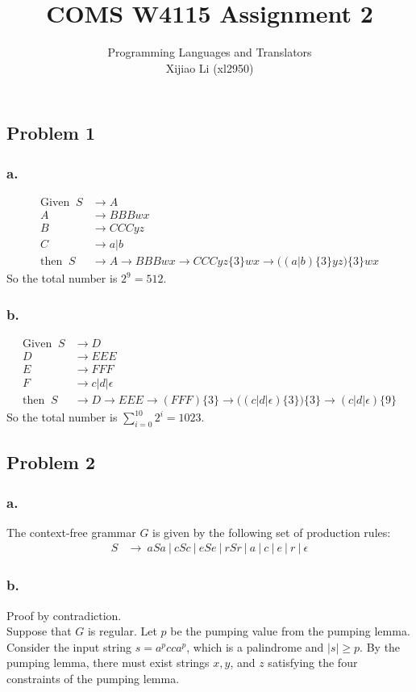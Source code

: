 \documentclass{article}
\title{COMS W4115
	Assignment 2}
\author{Programming Languages and Translators\medskip\\
	Xijiao Li (xl2950)}
\begin{document}
	
	\maketitle
	
	\newpage
	\subsection*{Problem 1}
	\subsubsection*{a.}
	\begin{align*}
		\text{Given }\  S &\to A \\
		A &\to  BBBwx \\
		B &\to  CCCyz \\
		C &\to a|b \\
		\text{then }\ S &\to A \to  BBBwx \to  {CCCyz}\{3\}wx \to \big((a|b)\{3\}yz\big)\{3\}wx
	\end{align*}
	So the total number is $2^9 = 512$.
	
	\subsubsection*{b.}
	\begin{align*}
		\text{Given }\  S&\to D\\
		D &\to  EEE \\
		E&\to FFF \\
		F&\to c|d|\epsilon \\
		\text{then }\ S &\to D \to  EEE \to  (FFF)\{3\} \to \big((c|d|\epsilon)\{3\}\big)\{3\} \to  (c|d|\epsilon)\{9\}
	\end{align*}
	So the total number is $\sum_{i=0}^{10} 2^i  = 1023$.
	
	\newpage
	\subsection*{Problem 2}
	\subsubsection*{a.}
	The context-free grammar $G$ is given by the following set of production rules:
	\begin{align*}
		S &\rightarrow \ aSa \ |\ cSc \ |\ eSe \ |\ rSr \ | \ a \ |\ c \ |\ e \ |\ r\ | \ \epsilon 
	\end{align*}
	\subsubsection*{b.}
	Proof by contradiction.\\
	Suppose that $G$ is regular. Let $p$ be the pumping value from the pumping lemma. Consider the input string $s = a^pcca^p$, which is a palindrome and $|s|\ge p$. By the pumping lemma, there must exist strings $x, y$, and $z$ satisfying the four constraints of the pumping lemma.
	
\end{document}

